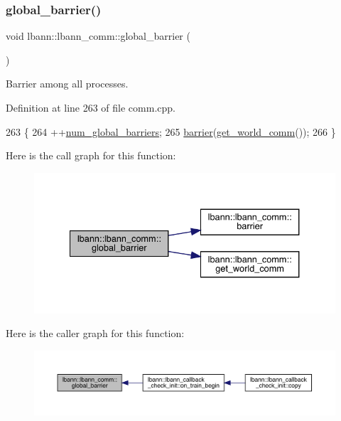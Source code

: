 \subsubsection{\texorpdfstring{global\+\_\+barrier()}{global\_barrier()}}
{\footnotesize\ttfamily void lbann\+::lbann\+\_\+comm\+::global\+\_\+barrier (\begin{DoxyParamCaption}{ }\end{DoxyParamCaption})}

Barrier among all processes. 

Definition at line 263 of file comm.\+cpp.


\begin{DoxyCode}
263                                 \{
264   ++\hyperlink{classlbann_1_1lbann__comm_a4f01e2f2d8220dc34cf39eb4a255cd7d}{num\_global\_barriers};
265   \hyperlink{classlbann_1_1lbann__comm_a303c02c5a127f3ed21f12c9a71cc90a6}{barrier}(\hyperlink{classlbann_1_1lbann__comm_a0493f1f0c42b95674daacf5288fdb073}{get\_world\_comm}());
266 \}
\end{DoxyCode}
Here is the call graph for this function\+:\nopagebreak
\begin{figure}[H]
\begin{center}
\leavevmode
\includegraphics[width=334pt]{classlbann_1_1lbann__comm_ae12af95f4826571efa03fb8520260daa_cgraph}
\end{center}
\end{figure}
Here is the caller graph for this function\+:\nopagebreak
\begin{figure}[H]
\begin{center}
\leavevmode
\includegraphics[width=350pt]{classlbann_1_1lbann__comm_ae12af95f4826571efa03fb8520260daa_icgraph}
\end{center}
\end{figure}
\mbox{\label{classlbann_1_1lbann__comm_a502bd724f9fb27f0e899306c69a3ec47}} 
